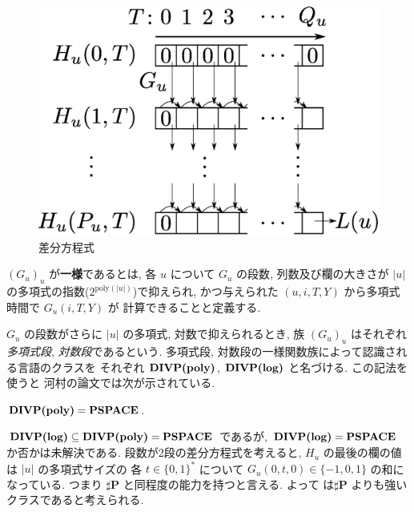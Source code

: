  \begin{figure}
  \label{fig:divp}
  \begin{center}
   \includegraphics[height=0.2\textheight]{image/divp.eps}
  \end{center}
  \caption{差分方程式}
 \end{figure}

$(G_u)_u$ が{\bf 一様}であるとは,
各 $u$ について $G _u$ の段数, 列数及び欄の大きさが $|u|$ の多項式の指数($2^{\mathrm{poly} (|u|)}$)で抑えられ, 
かつ与えられた $(u, i, T, Y)$ から多項式時間で $G_u(i, T, Y)$ が
計算できることと定義する.

$G_u$ の段数がさらに $|u|$ の多項式, 対数で抑えられるとき, 
族 $(G_u) _u$ はそれぞれ\emph{多項式段}, \emph{対数段}であるという. 
多項式段, 対数段の一様関数族によって認識される言語のクラスを
それぞれ $\text{\bf DIVP(poly)}$, $\text{\bf DIVP(log)}$ と名づける.
この記法を使うと
河村の論文では次が示されている.

 \begin{lemma}
  \label{WeakFeedback}
  $\text{\bf DIVP(poly)} = {\bf PSPACE}$.
 \end{lemma}

$\text{\bf DIVP(log)} \subseteq \text{\bf DIVP(poly)} = {\bf PSPACE}$ であるが, 
$\text{\bf DIVP(log)} = {\bf PSPACE}$ か否かは未解決である.
 段数が2段の差分方程式を考えると,
 $H_u$ の最後の欄の値は
 $|u|$ の多項式サイズの 各 $t \in \{0,1\}^*$ について
 $G_u(0, t, 0) \in \{-1, 0, 1\}$ の和になっている.
 つまり $\sharp${\bf P} と同程度の能力を持つと言える.
 よって \DIVPlog は$\sharp${\bf P} よりも強いクラスであると考えられる.
